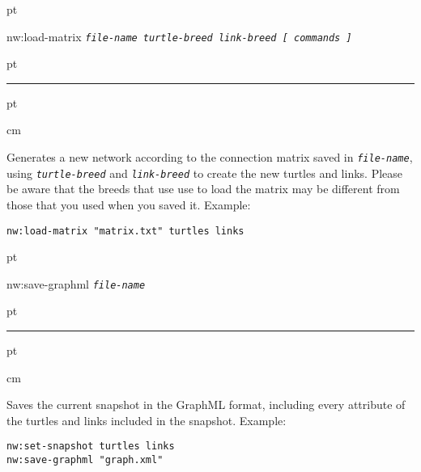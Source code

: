 \documentclass[10pt]{article}
\newenvironment{prim}{
  \vskip 6 pt
  \ttfamily
  \bfseries
}{
  \vskip 2 pt
  \hrule
  \vskip 6 pt
}
\newenvironment{doc}{
  \leftskip 0.5 cm
}
{}
\newcommand{\param}[1]{\texttt{\textit{\textmd{#1}}}}
\begin{document}
\begin{prim}
nw:load-matrix \param{file-name turtle-breed link-breed [ commands ]}
\end{prim}

\begin{doc}
Generates a new network according to the connection matrix saved in
\param{file-name}, using \param{turtle-breed} and \param{link-breed} to create
the new turtles and links. Please be aware that the breeds that use use to load the matrix may
be different from those that you used when you saved it. Example:

\begin{Verbatim}
nw:load-matrix "matrix.txt" turtles links
\end{Verbatim}
\end{doc}

\begin{prim}
nw:save-graphml \param{file-name}
\end{prim}

\begin{doc}
Saves the current snapshot in the GraphML format, including every attribute of
the turtles and links included in the snapshot. Example:
\begin{Verbatim}
nw:set-snapshot turtles links
nw:save-graphml "graph.xml"
\end{Verbatim}
\end{doc}
\end{document}
